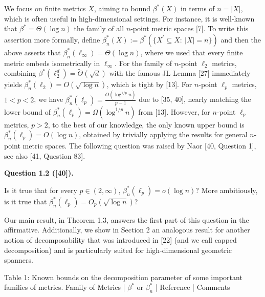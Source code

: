 \documentclass[10pt,a4paper]{amsart}
\begin{document}
\par
\par
We focus on finite metrics $X$, aiming to bound $\beta^{*}(X)$ in terms of $n=|X|$, which is often useful in high-dimensional settings. For instance, it is well-known that $\beta^{*}=\Theta(\log{n})$ the family of all $n$-point metric spaces [7]. To write this assertion more formally, define $\beta^{*}_{n}(X):=\beta^{*}(\{X^{\prime}\subseteq X:\ |X|=n\})$ and then the above asserts that $\beta^{*}_{n}(\ell_{\infty})=\Theta(\log n)$, where we used that every finite metric embeds isometrically in $\ell_{\infty}$. For the family of $n$-point $\ell_{2}$ metrics, combining $\beta^{*}(\ell_{2}^{d})=\tilde{\Theta}(\sqrt{d})$ with the famous JL Lemma [27] immediately yields $\beta^{*}_{n}(\ell_{2})=O(\sqrt{\log n})$, which is tight by [13]. For $n$-point $\ell_{p}$ metrics, $1<p<2$, we have $\beta^{*}_{n}(\ell_{p})=\frac{O(\log^{1/p}{n})}{p-1}$ due to [35, 40], nearly matching the lower bound of $\beta^{*}_{n}(\ell_{p})=\Omega(\log^{1/p}{n})$ from [13]. However, for $n$-point $\ell_{p}$ metrics, $p>2$, to the best of our knowledge, the only known upper bound is $\beta^{*}_{n}(\ell_{p})=O(\log n)$, obtained by trivially applying the results for general $n$-point metric spaces. The following question was raised by Naor [40, Question 1], see also [41, Question 83].
\par
\par
\par\medskip\noindent\textbf{Question 1.2 ([40]).}\par
Is it true that for every $p\in(2,\infty)$, $\beta^{*}_{n}(\ell_{p})=o(\log{n})$? More ambitiously, is it true that $\beta^{*}_{n}(\ell_{p})=O_{p}(\sqrt{\log{n}})$?
\par
\par
\par
Our main result, in Theorem 1.3, answers the first part of this question in the affirmative. Additionally, we show in Section 2 an analogous result for another notion of decomposability that was introduced in [22] (and we call capped decomposition) and is particularly suited for high-dimensional geometric spanners.
\par
\par
 Table 1: Known bounds on the decomposition parameter of some important families of metrics. 
\noindent Family of Metrics |  $\beta^{*}$ or $\beta^{*}_{n}$  | Reference | Comments\par
\end{document}
